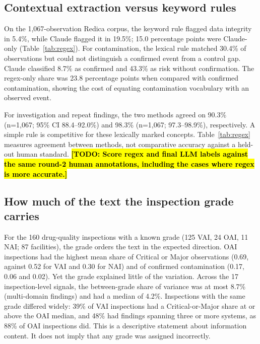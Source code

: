 \documentclass[12pt]{article}
\newcommand{\todo}[1]{\hl{\textbf{[TODO: #1]}}}
\begin{document}
\subsection{Contextual extraction versus keyword rules}

On the 1,067-observation Redica corpus, the keyword rule flagged data
integrity in 5.4\%, while Claude flagged it in 19.5\%; 15.0 percentage
points were Claude-only (Table~\ref{tab:regex}). For contamination,
the lexical rule matched 30.4\% of observations but could not distinguish
a confirmed event from a control gap. Claude classified 8.7\% as confirmed
and 43.3\% as risk without confirmation. The regex-only share was 23.8
percentage points when compared with confirmed contamination, showing the
cost of equating contamination vocabulary with an observed event.

For investigation and repeat findings, the two methods agreed on 90.3\%
(n=1,067; 95\% CI 88.4--92.0\%) and 98.3\% (n=1,067; 97.3--98.9\%),
respectively. A simple rule is competitive for these lexically marked
concepts. Table~\ref{tab:regex} measures agreement between methods, not
comparative accuracy against a held-out human standard.
\todo{Score regex and final LLM labels against the same round-2 human
annotations, including the cases where regex is more accurate.}



\subsection{How much of the text the inspection grade carries}
\label{sec:grade}

For the 160 drug-quality inspections with a known grade (125 VAI, 24 OAI,
11 NAI; 87 facilities), the grade orders the text in the expected direction.
OAI inspections had the highest mean share of Critical or Major observations
(0.69, against 0.52 for VAI and 0.30 for NAI) and of confirmed
contamination (0.17, 0.06 and 0.02). Yet the grade explained little of the
variation. Across the 17 inspection-level signals, the between-grade share
of variance was at most 8.7\% (multi-domain findings) and had a median of
4.2\%. Inspections with the same grade differed widely: 39\% of VAI
inspections had a Critical-or-Major share at or above the OAI median, and
48\% had findings spanning three or more systems, as 88\% of OAI
inspections did.
This is a descriptive statement about information content. It does not
imply that any grade was assigned incorrectly.
\end{document}
